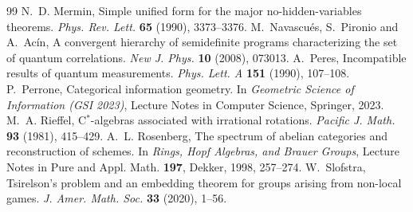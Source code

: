 \documentclass[11pt]{article}
\theoremstyle{definition}\newtheorem{definition}[theorem]{Definition}\newtheorem{remark}[theorem]{Remark}\newtheorem{example}[theorem]{Example}
\begin{document}
\begin{thebibliography}{99}
 N.~D. Mermin, Simple unified form for the major no-hidden-variables theorems. \emph{Phys. Rev. Lett.} \textbf{65} (1990),
  3373--3376.
 M.~Navascu\'es, S.~Pironio and A.~Ac\'in, A convergent hierarchy of semidefinite programs characterizing the set of quantum
  correlations. \emph{New J. Phys.} \textbf{10} (2008), 073013.
 A.~Peres, Incompatible results of quantum measurements. \emph{Phys. Lett. A} \textbf{151} (1990), 107--108.
 P.~Perrone, Categorical information geometry. In \emph{Geometric Science of Information (GSI 2023)}, Lecture Notes in
  Computer Science, Springer, 2023.
 M.~A. Rieffel, C$^*$-algebras associated with irrational rotations. \emph{Pacific J. Math.} \textbf{93} (1981), 415--429.
 A.~L. Rosenberg, The spectrum of abelian categories and reconstruction of schemes. In \emph{Rings, Hopf Algebras, and
  Brauer Groups}, Lecture Notes in Pure and Appl. Math. \textbf{197}, Dekker, 1998, 257--274.
 W.~Slofstra, Tsirelson's problem and an embedding theorem for groups arising from non-local games. \emph{J. Amer. Math.
  Soc.} \textbf{33} (2020), 1--56.
\end{thebibliography}
\end{document}
